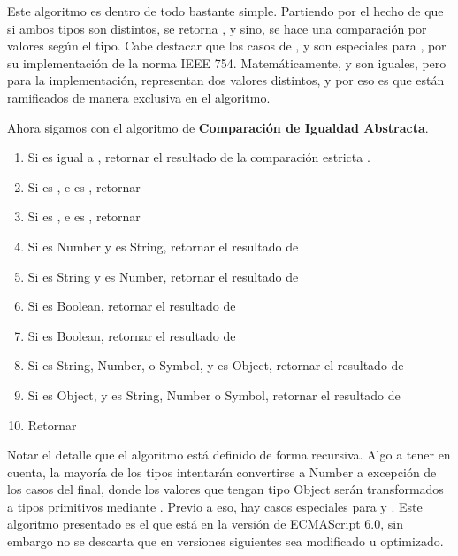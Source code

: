 Este algoritmo es dentro de todo bastante simple. Partiendo por el hecho de que si ambos tipos son distintos, se retorna , y sino, se hace una comparación por valores según el tipo. 
Cabe destacar que los casos de ,  y  son especiales para , por su implementación de la norma IEEE 754. Matemáticamente,  y  son iguales, pero para la implementación, representan dos valores distintos, y por eso es que están ramificados de manera exclusiva en el algoritmo.

Ahora sigamos con el algoritmo de \textbf{Comparación de Igualdad Abstracta}.

\begin{enumerate}
\item Si  es igual a , retornar el resultado de la comparación estricta .
\item Si  es , e  es , retornar 
\item Si  es , e  es , retornar 
\item Si  es Number y  es String, retornar el resultado de 
\item Si  es String y  es Number, retornar el resultado de 
\item Si  es Boolean, retornar el resultado de 
\item Si  es Boolean, retornar el resultado de 
\item Si  es String, Number, o Symbol, y  es Object, retornar el resultado de 
\item Si  es Object, y  es String, Number o Symbol, retornar el resultado de 
\item Retornar 
\end{enumerate}

Notar el detalle que el algoritmo está definido de forma recursiva. Algo a tener en cuenta, la mayoría de los tipos intentarán convertirse a Number a excepción de los casos del final, donde los valores que tengan tipo Object serán transformados a tipos primitivos mediante . Previo a eso, hay casos especiales para  y . Este algoritmo presentado es el que está en la versión de ECMAScript 6.0, sin embargo no se descarta que en versiones siguientes sea modificado u optimizado.

